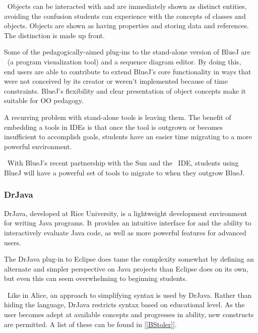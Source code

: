 \documentclass{sig-alt-release}
\begin{document}
      \CKollingBlueJInspection\
      Objects can be interacted with and are immediately shown as distinct
      entities, avoiding the confusion students can experience with the concepts
      of classes and objects. Objects are shown as having properties and storing
      data and references. The distinction is made up front.

      Some of the pedagogically-aimed plug-ins to the stand-alone version of
      BlueJ are \jeliot\ (a program visualization tool) and a sequence diagram
      editor. By doing this, end users are able to contribute to extend BlueJ's
      core functionality in ways that were not conceived by its creator or
      weren't implemented because of time constraints. BlueJ's flexibility and
      clear presentation of object concepts make it suitable for OO pedagogy.
    
      A recurring problem with stand-alone tools is leaving them. The benefit of
      embedding a tools in IDEs is that once the tool is outgrown or becomes
      insufficient to accomplish goals, students have an easier time migrating
      to a more powerful environment.
      
      \CBlueJToNetBeans\
      With BlueJ's recent partnership with the Sun and the \netbeans\ IDE,
      students using BlueJ will have a powerful set of tools to migrate to when
      they outgrow BlueJ.
    
    \subsubsection{DrJava}
      DrJava, developed at Rice University, is a lightweight development
      environment for writing Java programs. It provides an intuitive interface
      for and the ability to interactively evaluate Java code, as well as more
      powerful features for advanced users.

      The DrJava plug-in to Eclipse does tame the complexity somewhat by
      defining an alternate and simpler perspective on Java projects than
      Eclipse does on its own, but even this can seem overwhelming to beginning
      students.

      \DrJavaPed\
      Like in Alice, an approach to simplifying syntax is used by DrJava. Rather
      than hiding the language, DrJava restricts syntax based on educational
      level. As the user becomes adept at available concepts and progresses in
      ability, new constructs are permitted. A list of these can be found in
      [\ref{BStoler}].
\end{document}
